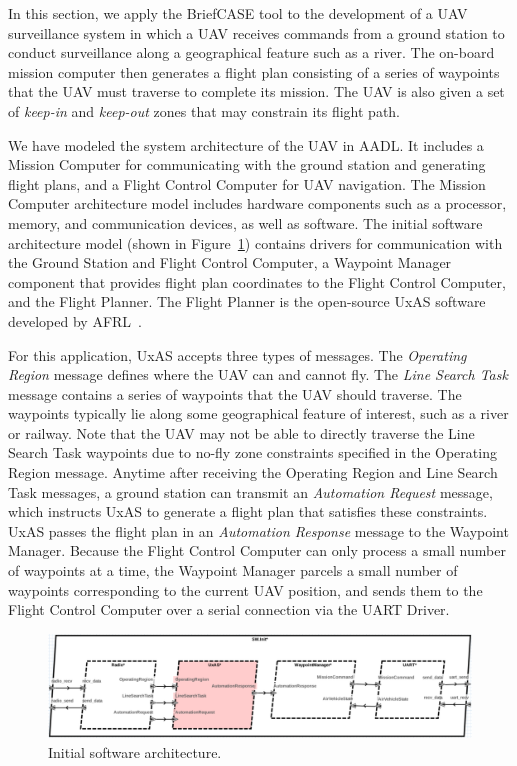In this section, we apply the BriefCASE tool to the development of a UAV surveillance system in which a UAV receives commands from a ground station to conduct surveillance along a geographical feature such as a river. The on-board mission computer then generates a flight plan consisting of a series of waypoints that the UAV must traverse to complete its mission. The UAV is also given a set of \textit{keep-in} and \textit{keep-out} zones that may constrain its flight path.

We have modeled the system architecture of the UAV in AADL.  It includes a Mission Computer for communicating with the ground station and generating flight plans, and a Flight Control Computer for UAV navigation.  The Mission Computer architecture model includes hardware components such as a processor, memory, and communication devices, as well as software.
%
The initial software architecture model (shown in Figure~\ref{fig:sw-initial}) contains drivers for communication with the Ground Station and Flight Control Computer, a Waypoint Manager component that provides flight plan coordinates to the Flight Control Computer, and the Flight Planner.  The Flight Planner is the open-source UxAS software developed by AFRL~\cite{uxas}. 

For this application, UxAS accepts three types of messages.  The \textit{Operating Region} message defines where the UAV can and cannot fly.  The \textit{Line Search Task} message contains a series of waypoints that the UAV should traverse.  The waypoints typically lie along some geographical feature of interest, such as a river or railway.  Note that the UAV may not be able to directly traverse the Line Search Task waypoints due to no-fly zone constraints specified in the Operating Region message.  Anytime after receiving the Operating Region and Line Search Task messages, a ground station can transmit an \textit{Automation Request} message, which instructs UxAS to generate a flight plan that satisfies these constraints.  UxAS passes the flight plan in an \textit{Automation Response} message to the Waypoint Manager.  Because the Flight Control Computer can only process a small number of waypoints at a time, the Waypoint Manager parcels a small number of waypoints corresponding to the current UAV position, and sends them to the Flight Control Computer over a serial connection via the UART Driver.

\begin{figure}[h]
	\centering
	\includegraphics[width=1\columnwidth]{figs/sw-initial.png}
	\caption{Initial software architecture.} 
	\label{fig:sw-initial} 
\end{figure}

